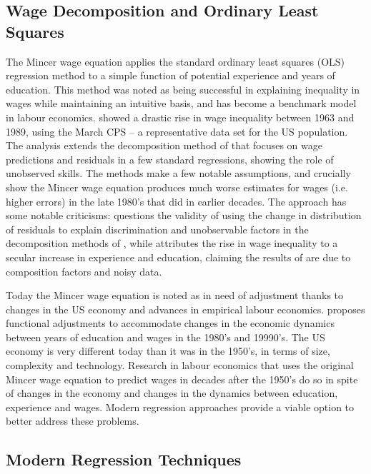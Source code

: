 \documentclass[notitlepage,12pt]{article}
\begin{document}
\subsection{Wage Decomposition and Ordinary Least Squares}

The Mincer wage equation applies the standard ordinary least squares (OLS) regression method to a  simple function of potential experience and years of education.  This method was noted as being successful in explaining inequality in wages while maintaining an intuitive basis, and has become a benchmark model in labour economics.  \cite{juhn1993wage} showed a drastic rise in wage inequality between 1963 and 1989, using the March CPS -- a representative data set for the US population.  The analysis extends the decomposition method of \cite{jmp2011} that focuses on wage predictions and residuals in a few standard regressions, showing the role of unobserved skills.  The methods make a few notable assumptions, and crucially show the Mincer wage equation produces much worse estimates for wages (i.e. higher errors) in the late 1980's that did in earlier decades.  The approach has some notable criticisms: \cite{yun2009wage} questions the validity of using the change in distribution of residuals to explain discrimination and unobservable factors in the decomposition methods of \cite{jmp2011,juhn1993wage}, while \cite{lemieux2006increasing} attributes the rise in wage inequality to a secular increase in experience and education, claiming the results of \cite{juhn1993wage} are due to composition factors and noisy data.

Today the Mincer wage equation is noted as in need of adjustment thanks to changes in the US economy and advances in empirical labour economics.  \cite{lemieux2006mincer} proposes functional adjustments to accommodate changes in the economic dynamics between years of education and wages in the 1980's and 19990's.  The US economy is very different today than it was in the 1950's, in terms of size, complexity and technology.  Research in labour economics that uses the original Mincer wage equation to predict wages in decades after the 1950's do so in spite of changes in the economy and changes in the dynamics between education, experience and wages.  Modern regression approaches provide a viable option to better address these problems.



\subsection{Modern Regression Techniques}
\end{document}
